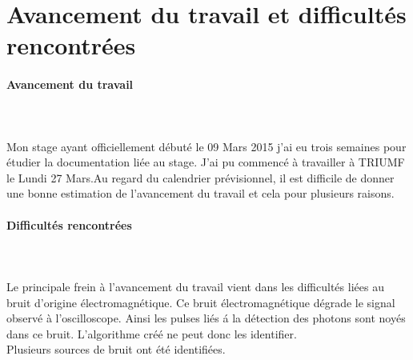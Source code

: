\documentclass[a4paper, 11pt]{report}%
\begin{document}
\section{Avancement du travail et difficult\'es rencontr\'ees}
 
\paragraph{Avancement du travail}
  \hspace{1cm}\\ \\
  Mon stage ayant officiellement d\'ebut\'e le 09 Mars 2015 j'ai eu trois semaines pour \'etudier la documentation li\'ee au stage. J'ai pu commenc\'e \`a 
  travailler \`a TRIUMF le Lundi 27 Mars.Au regard du calendrier pr\'evisionnel, il est difficile de donner une bonne estimation de l'avancement du travail 
  et cela pour plusieurs raisons. 

\paragraph{Difficult\'es rencontr\'ees}
  \hspace{1cm}\\ \\
  Le principale frein \`a l'avancement du travail vient dans les difficult\'es li\'ees au bruit d'origine \'electromagn\'etique. Ce bruit \'electromagn\'etique
  d\'egrade le signal observ\'e \`a l'oscilloscope. Ainsi les pulses li\'es \' a la d\'etection des photons sont noy\'es dans ce bruit. L'algorithme cr\'e\'e ne peut donc les 
  identifier. 
  \\
  Plusieurs sources de bruit ont \'et\'e identifi\'ees.  
\end{document}
